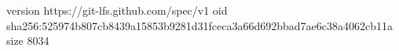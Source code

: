 version https://git-lfs.github.com/spec/v1
oid sha256:525974b807cb8439a15853b9281d31fceca3a66d692bbad7ae6c38a4062cb11a
size 8034

